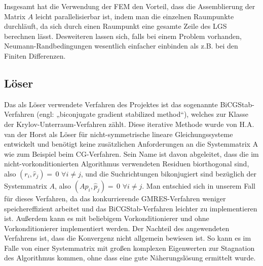 Insgesamt hat die Verwendung der FEM den Vorteil, dass die Assemblierung der Matrix $A$ leicht parallelisierbar ist, indem man die einzelnen Raumpunkte durchläuft, da sich durch einen Raumpunkt eine gesamte Zeile des LGS berechnen lässt. Desweiteren lassen sich, falls bei einem Problem vorhanden, Neumann-Randbedingungen wesentlich einfacher einbinden als z.B. bei den Finiten Differenzen. 


\subsection{Löser}
Das als Löser verwendete Verfahren des Projektes ist das sogenannte BiCGStab-Verfahren (engl: „biconjugate gradient stabilized method“), welches zur Klasse der Krylov-Unterraum-Verfahren zählt. Diese iterative Methode wurde von H.A. van der Horst als Löser für nicht-symmetrische lineare Gleichungssysteme entwickelt und benötigt keine zusätzlichen Anforderungen an die Systemmatrix A wie zum Beispiel beim CG-Verfahren. Sein Name ist davon abgeleitet, dass die im nicht-vorkonditionierten Algorithmus verwendeten Residuen biorthogonal sind, also $(r_i,\hat{r}_j)=\,0$ $\forall i\neq j$, und die Suchrichtungen bikonjugiert sind bezüglich der Systemmatrix $A$, also $(Ap_i,\hat{p}_j)=\,0$ $ \forall i \neq j$.  Man entschied sich in unserem Fall für dieses Verfahren, da das konkurrierende GMRES-Verfahren weniger speichereffizient arbeitet und das BiCGStab-Verfahren leichter zu implementieren ist.  Au\ss{}erdem kann es mit beliebigem Vorkonditionierer und ohne Vorkonditionierer implementiert werden. Der Nachteil des angewendeten Verfahrens ist, dass die Konvergenz nicht allgemein bewiesen ist. So kann es im Falle von einer Systemmatrix mit großen komplexen Eigenwerten zur Stagnation des Algorithmus kommen, ohne dass eine gute Näherungslösung ermittelt wurde. \\



